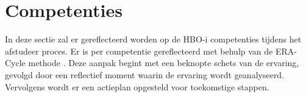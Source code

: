 \section{Competenties}
In deze sectie zal er gereflecteerd worden op de HBO-i \parencite{HBOICompetenties} competenties tijdens het afstudeer proces.
Er is per competentie gereflecteerd met behulp van de ERA-Cycle methode \parencite{BeginningReflectivePractice}.
Deze aanpak begint met een beknopte schets van de ervaring, gevolgd door een reflectief moment waarin de ervaring wordt geanalyseerd.
Vervolgens wordt er een actieplan opgesteld voor toekomstige stappen.


\newpage





